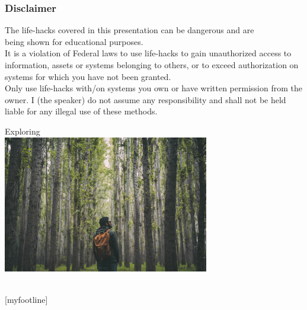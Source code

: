 \documentclass[aspectratio=169]{beamer}
\begin{document}
\begin{frame}
  \frametitle{Disclaimer}
  \begin{tcolorbox}[title=disclaimer.log,colback=gray]
    The life-hacks covered in this presentation can be dangerous and are\\
    being shown for educational purposes.\\
    \newline
    It is a violation of Federal laws to use life-hacks to gain unauthorized access to information, assets or systems belonging to others, or to exceed authorization on systems for which you have not been granted.\\
    \newline
    Only use life-hacks with/on systems you own or have written permission from the owner. I (the speaker) do not assume any responsibility and shall not be held liable for any illegal use of these methods.\\
  \end{tcolorbox}
\end{frame}


\begin{frame}[t]
  \begin{center}
    \begingroup
    \fontsize{20pt}{20pt}\selectfont
    Exploring \\
    \endgroup
    \bigskip
    \includegraphics[width=9cm,keepaspectratio]{exploring} \\
    \bigskip
    \inserttitle \\
  \end{center}
\end{frame}

[myfootline]
\end{document}
